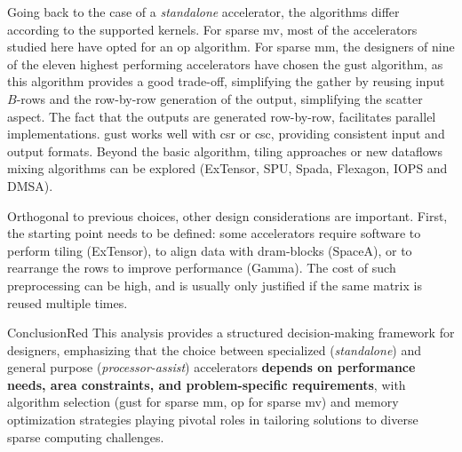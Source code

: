 Going back to the case of a \textit{standalone} accelerator, the algorithms differ according to the supported kernels.
For sparse \acrshort{mv}, most of the accelerators studied here have opted for an \acrshort{op} algorithm.
For sparse \acrshort{mm}, the designers of nine of the eleven highest performing accelerators have chosen the \acrshort{gust} algorithm, as this algorithm provides a good trade-off, simplifying the \gls{gather} by reusing input $B$-rows and the row-by-row generation of the output, simplifying the \gls{scatter} aspect.
The fact that the outputs are generated row-by-row, facilitates parallel implementations.
\acrshort{gust} works well with \acrshort{csr} or \acrshort{csc}, providing consistent input and output formats.
Beyond the basic algorithm, \gls{tiling} approaches or new dataflows mixing algorithms can be explored (\eg ExTensor, SPU, Spada, Flexagon, IOPS and DMSA).

Orthogonal to previous choices, other design considerations are important.
First, the starting point needs to be defined: some accelerators require software to perform \gls{tiling} (\eg ExTensor), to align data with \acrshort{dram}-blocks (\eg SpaceA), or to rearrange the rows to improve performance (\eg Gamma).
The cost of such preprocessing can be high, and is usually only justified if the same matrix is reused multiple times.

\begin{highlight}{Conclusion}{Red}
    This analysis provides a structured decision-making framework for designers, emphasizing that the choice between specialized (\textit{standalone}) and general purpose (\textit{processor-assist}) accelerators \textbf{depends on performance needs, area constraints, and problem-specific requirements}, with algorithm selection (\eg \acrlong{gust} for sparse \acrshort{mm}, \acrlong{op} for sparse \acrshort{mv}) and memory optimization strategies playing pivotal roles in tailoring solutions to diverse sparse computing challenges.
\end{highlight}